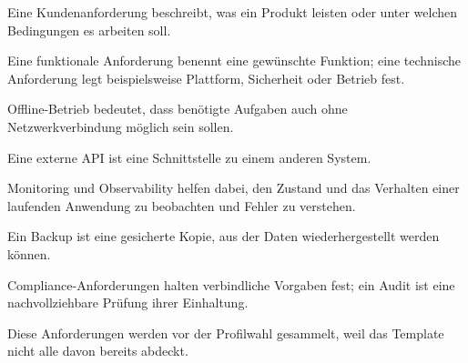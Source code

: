 \begin{beginnerstatement}

Eine Kundenanforderung beschreibt, was ein Produkt leisten oder unter welchen
Bedingungen es arbeiten soll.

Eine funktionale Anforderung benennt eine gewünschte Funktion; eine technische
Anforderung legt beispielsweise Plattform, Sicherheit oder Betrieb fest.

Offline-Betrieb bedeutet, dass benötigte Aufgaben auch ohne Netzwerkverbindung
möglich sein sollen.

Eine externe API ist eine Schnittstelle zu einem anderen System.

Monitoring und Observability helfen dabei, den Zustand und das Verhalten einer
laufenden Anwendung zu beobachten und Fehler zu verstehen.

Ein Backup ist eine gesicherte Kopie, aus der Daten wiederhergestellt werden
können.

Compliance-Anforderungen halten verbindliche Vorgaben fest; ein Audit ist eine
nachvollziehbare Prüfung ihrer Einhaltung.

Diese Anforderungen werden vor der Profilwahl gesammelt, weil das Template
nicht alle davon bereits abdeckt.

\end{beginnerstatement}
